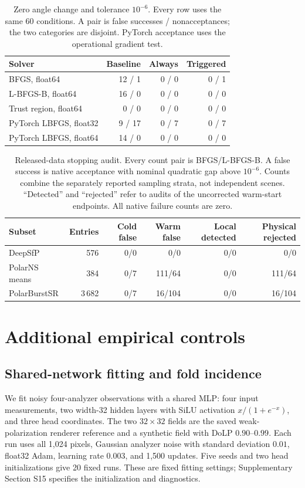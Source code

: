 \documentclass[10pt,a4paper]{article}
\begin{document}
\begin{table}[H]
\caption{Zero angle change and tolerance $10^{-6}$. Every row uses the same 60 conditions. A pair is false successes / nonacceptances; the two categories are disjoint. PyTorch acceptance uses the operational gradient test.}
\label{tab:warm}
\centering\small
\begin{tabular}{@{}lrrr@{}}\toprule
Solver & Baseline & Always & Triggered\\\midrule
BFGS, float64 & 12 / 1 & 0 / 0 & 0 / 1\\
L-BFGS-B, float64 & 16 / 0 & 0 / 0 & 0 / 0\\
Trust region, float64 & 0 / 0 & 0 / 0 & 0 / 0\\
PyTorch LBFGS, float32 & 9 / 17 & 0 / 7 & 0 / 7\\
PyTorch LBFGS, float64 & 14 / 0 & 0 / 0 & 0 / 0\\\bottomrule
\end{tabular}
\end{table}

\begin{table}[H]
\caption{Released-data stopping audit. Every count pair is BFGS/L-BFGS-B. A false success is native acceptance with nominal quadratic gap above $10^{-6}$. Counts combine the separately reported sampling strata, not independent scenes. ``Detected'' and ``rejected'' refer to audits of the uncorrected warm-start endpoints. All native failure counts are zero.}
\label{tab:realdata}
\centering\small\renewcommand{\arraystretch}{1.15}
\begin{tabularx}{\textwidth}{@{}Xrrrrr@{}}\toprule
Subset & Entries & Cold false & Warm false & Local detected & Physical rejected\\\midrule
DeepSfP & 576 & 0/0 & 0/0 & 0/0 & 0/0\\
PolarNS means & 384 & 0/7 & 111/64 & 0/0 & 111/64\\
PolarBurstSR & 3\,682 & 0/7 & 16/104 & 0/0 & 16/104\\\bottomrule
\end{tabularx}
\end{table}


\FloatBarrier
\section{Additional empirical controls}
\label{sec:empiricalcontrols}
\subsection{Shared-network fitting and fold incidence}
We fit noisy four-analyzer observations with a shared MLP: four input measurements, two width-32 hidden layers with SiLU activation $x/(1+e^{-x})$, and three head coordinates. The two $32\times32$ fields are the saved weak-polarization renderer reference and a synthetic field with DoLP $0.90$--$0.99$. Each run uses all 1,024 pixels, Gaussian analyzer noise with standard deviation $0.01$, float32 Adam, learning rate $0.003$, and 1,500 updates. Five seeds and two head initializations give 20 fixed runs. These are fixed fitting settings; Supplementary Section S15 specifies the initialization and diagnostics.
\end{document}
